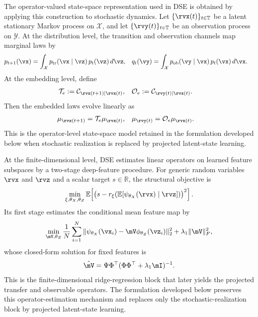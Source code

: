 \documentclass[twoside,11pt]{article}
\begin{document}
The operator-valued state-space representation used in DSE is obtained by applying this construction to stochastic dynamics. Let $\{\rvx(t)\}_{t\in\mathbb T}$ be a latent stationary Markov process on $\mathcal X$, and let $\{\rvy(t)\}_{t\in\mathbb T}$ be an observation process on $\mathcal Y$. At the distribution level, the transition and observation channels map marginal laws by
\begin{align}
p_{t+1}(\vx)
&=
\int_{\mathcal X}
p_{\mathrm{tr}}(\vx \mid \vz)\,p_t(\vz)\,d\vz,
&
q_t(\vy)
&=
\int_{\mathcal X}
p_{\mathrm{ob}}(\vy \mid \vx)\,p_t(\vx)\,d\vx .
\label{eq:density_level_dynamics}
\end{align}
At the embedding level, define
\begin{align}
\mathcal T_e
&:=
\mathcal C_{\rvx(t+1)\mid \rvx(t)},
&
\mathcal O_e
&:=
\mathcal C_{\rvy(t)\mid \rvx(t)}.
\label{eq:operator_level_maps}
\end{align}
Then the embedded laws evolve linearly as
\begin{align}
\mu_{\rvx(t+1)}
&=
\mathcal T_e \mu_{\rvx(t)},
&
\mu_{\rvy(t)}
&=
\mathcal O_e \mu_{\rvx(t)}.
\label{eq:operator_level_ssm}
\end{align}
This is the operator-level state-space model retained in the formulation developed below when stochastic realization is replaced by projected latent-state learning.

At the finite-dimensional level, DSE estimates linear operators on learned feature subspaces by a two-stage deep-feature procedure. For generic random variables $\rvx$ and $\rvz$ and a scalar target $s\in\mathbb R$, the structural objective is
\begin{align}
\min_{\xi,\theta_X,\theta_Z}
\mathbb E
\!\left[
\bigl(
s-r_\xi(\mathbb E[\psi_{\theta_X}(\rvx)\mid \rvz])
\bigr)^2
\right].
\label{eq:two_stage_target}
\end{align}
Its first stage estimates the conditional mean feature map by
\begin{align}
\min_{\mV,\theta_Z}
\frac{1}{N}
\sum_{i=1}^N
\|\psi_{\theta_X}(\vx_i)-\mV\phi_{\theta_Z}(\vz_i)\|_2^2
+
\lambda_1\|\mV\|_F^2,
\label{eq:two_stage_stage1}
\end{align}
whose closed-form solution for fixed features is
\begin{align}
\hat{\mV}
=
\Psi\Phi^\top(\Phi\Phi^\top+\lambda_1\mI)^{-1}.
\label{eq:two_stage_closed_form}
\end{align}
This is the finite-dimensional ridge-regression block that later yields the projected transfer and observable operators. The formulation developed below preserves this operator-estimation mechanism and replaces only the stochastic-realization block by projected latent-state learning.
\end{document}
